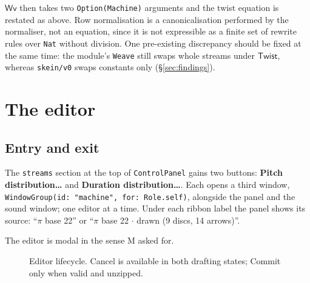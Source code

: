 \documentclass[11pt,a4paper]{article}
\theoremstyle{definition}
\theoremstyle{plain}
\theoremstyle{remark}
\begin{document}
$\mathsf{Wv}$ then takes two \texttt{Option(Machine)} arguments and the twist equation is restated
as above. Row normalisation is a canonicalisation performed by the normaliser, not an equation, since
it is not expressible as a finite set of rewrite rules over \texttt{Nat} without division. One
pre-existing discrepancy should be fixed at the same time: the module's \texttt{Weave} still swaps
whole streams under $\mathsf{Twist}$, whereas \texttt{skein/v0} swaps constants only (\S\ref{sec:findings}).

\section{The editor}

\subsection{Entry and exit}

The \texttt{streams} section at the top of \texttt{ControlPanel} gains two buttons:
\textbf{Pitch distribution\ldots} and \textbf{Duration distribution\ldots}. Each opens a third
window, \texttt{WindowGroup(id: "machine", for: Role.self)}, alongside the panel and the sound
window; one editor at a time. Under each ribbon label the panel shows its source: ``$\pi$ base 22'' or
``$\pi$ base 22 $\cdot$ drawn (9 discs, 14 arrows)''.

The editor is modal in the sense M asked for.

\begin{figure}[H]\centering
{}
\caption{Editor lifecycle. Cancel is available in both drafting states; Commit only when valid and
unzipped.}
\end{figure}
\end{document}
